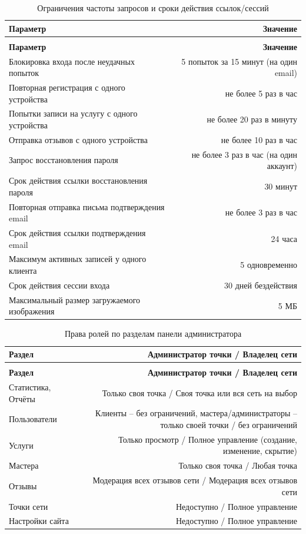 \begin{xltabular}{\textwidth}{|>{\raggedright\arraybackslash}p{7.5cm}|D|}
\caption{Ограничения частоты запросов и сроки действия ссылок/сессий} \\
\hline
\textbf{Параметр} & \textbf{Значение} \\
\hline
\endfirsthead
\hline
{}\\
\hline
\textbf{Параметр} & \textbf{Значение} \\
\hline
\endhead
\hline
\endfoot
Блокировка входа после неудачных попыток & 5 попыток за 15 минут (на
  один email) \\
\hline
Повторная регистрация с одного устройства & не более 5 раз в час \\
\hline
Попытки записи на услугу с одного устройства & не более 20 раз в минуту \\
\hline
Отправка отзывов с одного устройства & не более 10 раз в час \\
\hline
Запрос восстановления пароля & не более 3 раз в час (на один аккаунт) \\
\hline
Срок действия ссылки восстановления пароля & 30 минут \\
\hline
Повторная отправка письма подтверждения email & не более 3 раз в час \\
\hline
Срок действия ссылки подтверждения email & 24 часа \\
\hline
Максимум активных записей у одного клиента & 5 одновременно \\
\hline
Срок действия сессии входа & 30 дней бездействия \\
\hline
Максимальный размер загружаемого изображения & 5 МБ \\
\end{xltabular}

\begin{xltabular}{\textwidth}{|>{\raggedright\arraybackslash}p{4.5cm}|D|}
\caption{Права ролей по разделам панели администратора} \\
\hline
\textbf{Раздел} & \textbf{Администратор точки / Владелец сети} \\
\hline
\endfirsthead
\hline
{}\\
\hline
\textbf{Раздел} & \textbf{Администратор точки / Владелец сети} \\
\hline
\endhead
\hline
\endfoot
Статистика, Отчёты & Только своя точка / Своя точка или вся сеть на
  выбор \\
\hline
Пользователи & Клиенты -- без ограничений, мастера/администраторы --
  только своей точки / без ограничений \\
\hline
Услуги & Только просмотр / Полное управление (создание, изменение,
  скрытие) \\
\hline
Мастера & Только своя точка / Любая точка \\
\hline
Отзывы & Модерация всех отзывов сети / Модерация всех отзывов сети \\
\hline
Точки сети & Недоступно / Полное управление \\
\hline
Настройки сайта & Недоступно / Полное управление \\
\end{xltabular}

